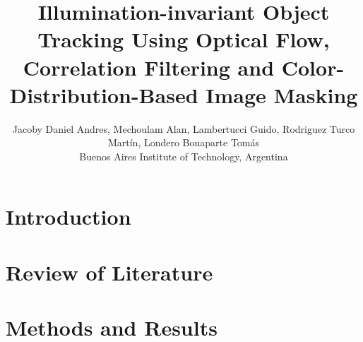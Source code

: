

\usepackage[procnames]{listings}





\title{Illumination-invariant Object Tracking Using Optical Flow, Correlation Filtering and Color-Distribution-Based Image Masking}
\author{Jacoby Daniel Andres, Mechoulam Alan, Lambertucci Guido, Rodriguez Turco Martín, Londero Bonaparte Tomás\\
\small{Buenos Aires Institute of Technology, Argentina}}

\twocolumn[
  \begin{@twocolumnfalse}
    \maketitle
    \begin{abstract}
		
	\end{abstract}
  \end{@twocolumnfalse}
  ]





%



\section{Introduction}

	
\section{Review of Literature}


\section{Methods and Results}


